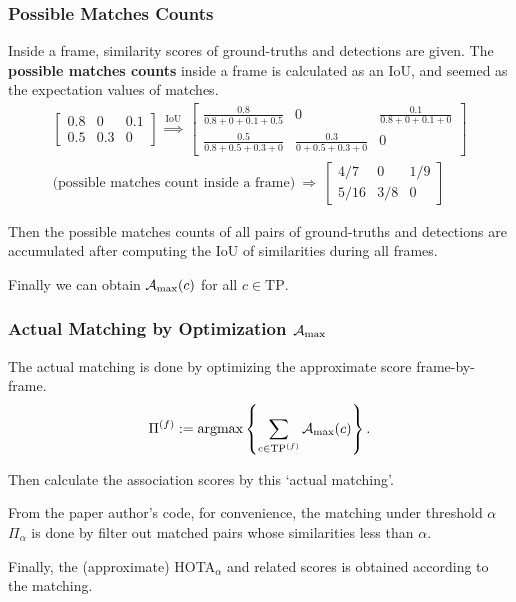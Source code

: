 \documentclass[slidetop, mathserif, dvipsnames]{beamer}
\begin{document}
\begin{frame}
	\frametitle{Possible Matches Counts}

	Inside a frame, similarity scores of ground-truths and detections are given.
	The {\bf possible matches counts} inside a frame
	is calculated as an IoU, and seemed as the expectation values of matches.
	\begin{align*}
	\begin{bmatrix}	
	0.8                       & 0                       & 0.1                     \\
	0.5                       & 0.3                     & 0                       
	\end{bmatrix}
	\ \stackrel{\text{IoU}}{\Rightarrow}\ 
	\begin{bmatrix}
	\frac{0.8}{0.8+0+0.1+0.5} & 0                       & \frac{0.1}{0.8+0+0.1+0} \\
	\frac{0.5}{0.8+0.5+0.3+0} & \frac{0.3}{0+0.5+0.3+0} & 0                       
	\end{bmatrix} \\
	\text{(possible matches count inside a frame)}~ \Rightarrow ~ 
	\begin{bmatrix}
	4/7                       & 0                       & 1/9                     \\
	5/16                      & 3/8                     & 0                       
	\end{bmatrix}
	\end{align*}

	Then the possible matches counts of all pairs of ground-truths and detections
	are accumulated after computing the IoU of similarities during all frames.

	Finally we can obtain $\mathcal A_{\rm max}(c)$ for
	all $c\in\text{TP}$.

\end{frame}

\begin{frame}
	\frametitle{Actual Matching by Optimization $\mathcal A_{\rm max}$}

	The actual matching is done by
	optimizing the approximate score frame-by-frame.
	\[
		\Pi^{(f)} := 
		\text{argmax}\left\{ \sum\limits_{c\in\text{TP}^{(f)}} \mathcal A_{\rm max}(c) \right\}.
	\]

	Then calculate the association scores by this `actual matching'.

	\vspace{3pt}

	From the paper author's code, for convenience, 
	the matching under threshold $\alpha$ $\Pi_\alpha$ is done by
	filter out matched pairs whose similarities less than $\alpha$.

	\vspace{5pt}

	Finally, the (approximate) HOTA$_\alpha$ and related scores
	is obtained according to the matching.

\end{frame}
\end{document}
